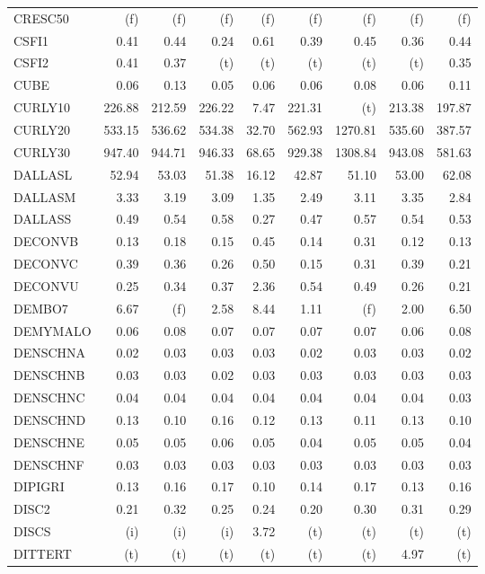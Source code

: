 \documentclass[11pt,twoside]{article}
\begin{document}
{\begin{longtable}[c]{|l|r|r|r|r|r|r|r|r|}
CRESC50 & (f) & (f) & (f) & (f) & (f) & (f) & (f) & (f) \\
CSFI1 & 0.41 & 0.44 & 0.24 & 0.61 & 0.39 & 0.45 & 0.36 & 0.44 \\
CSFI2 & 0.41 & 0.37 & (t) & (t) & (t) & (t) & (t) & 0.35 \\
CUBE & 0.06 & 0.13 & 0.05 & 0.06 & 0.06 & 0.08 & 0.06 & 0.11 \\
CURLY10 & 226.88 & 212.59 & 226.22 & 7.47 & 221.31 & (t) & 213.38 & 197.87 \\
CURLY20 & 533.15 & 536.62 & 534.38 & 32.70 & 562.93 & 1270.81 & 535.60 & 387.57 \\
CURLY30 & 947.40 & 944.71 & 946.33 & 68.65 & 929.38 & 1308.84 & 943.08 & 581.63 \\
DALLASL & 52.94 & 53.03 & 51.38 & 16.12 & 42.87 & 51.10 & 53.00 & 62.08 \\
DALLASM & 3.33 & 3.19 & 3.09 & 1.35 & 2.49 & 3.11 & 3.35 & 2.84 \\
DALLASS & 0.49 & 0.54 & 0.58 & 0.27 & 0.47 & 0.57 & 0.54 & 0.53 \\
DECONVB & 0.13 & 0.18 & 0.15 & 0.45 & 0.14 & 0.31 & 0.12 & 0.13 \\
DECONVC & 0.39 & 0.36 & 0.26 & 0.50 & 0.15 & 0.31 & 0.39 & 0.21 \\
DECONVU & 0.25 & 0.34 & 0.37 & 2.36 & 0.54 & 0.49 & 0.26 & 0.21 \\
DEMBO7 & 6.67 & (f) & 2.58 & 8.44 & 1.11 & (f) & 2.00 & 6.50 \\
DEMYMALO & 0.06 & 0.08 & 0.07 & 0.07 & 0.07 & 0.07 & 0.06 & 0.08 \\
DENSCHNA & 0.02 & 0.03 & 0.03 & 0.03 & 0.02 & 0.03 & 0.03 & 0.02 \\
DENSCHNB & 0.03 & 0.03 & 0.02 & 0.03 & 0.03 & 0.03 & 0.03 & 0.03 \\
DENSCHNC & 0.04 & 0.04 & 0.04 & 0.04 & 0.04 & 0.04 & 0.04 & 0.03 \\
DENSCHND & 0.13 & 0.10 & 0.16 & 0.12 & 0.13 & 0.11 & 0.13 & 0.10 \\
DENSCHNE & 0.05 & 0.05 & 0.06 & 0.05 & 0.04 & 0.05 & 0.05 & 0.04 \\
DENSCHNF & 0.03 & 0.03 & 0.03 & 0.03 & 0.03 & 0.03 & 0.03 & 0.03 \\
DIPIGRI & 0.13 & 0.16 & 0.17 & 0.10 & 0.14 & 0.17 & 0.13 & 0.16 \\
DISC2 & 0.21 & 0.32 & 0.25 & 0.24 & 0.20 & 0.30 & 0.31 & 0.29 \\
DISCS & (i) & (i) & (i) & 3.72 & (t) & (t) & (t) & (t) \\
DITTERT & (t) & (t) & (t) & (t) & (t) & (t) & 4.97 & (t) \\

\end{longtable}}
\end{document}
